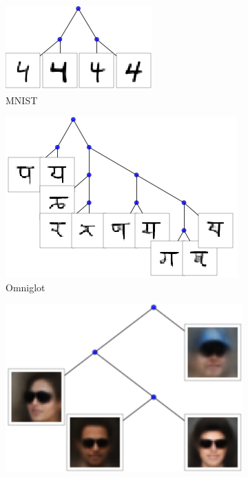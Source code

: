 \begin{figure}[t]
\centering
\begin{subfigure}[t]{0.2\textwidth}
\centering
\includegraphics[width=\textwidth]{img/loracs/mnist/subtree1.png}
\caption{MNIST}
\end{subfigure}
\begin{subfigure}[t]{0.2\textwidth}
\centering
\includegraphics[width=\textwidth]{img/loracs/omniglot/subtree1.png}
\caption{Omniglot}
\end{subfigure}
\begin{subfigure}[t]{0.2\textwidth}
\centering
\includegraphics[width=\textwidth]{img/loracs/celeba/subtree1.png}

\end{subfigure}
\end{figure}
